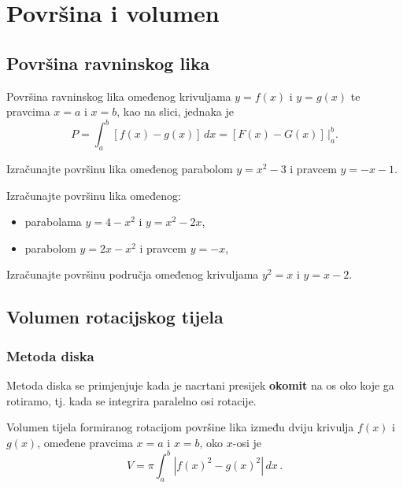 \section{Površina i volumen}

\subsection{Površina ravninskog lika}

Površina ravninskog lika omeđenog krivuljama $y=f(x)$ i $y=g(x)$ te pravcima
$x=a$ i $x=b$, kao na slici, jednaka je
$$
    P=\int_a^b [f(x) - g(x)]\,dx = [F(x) - G(x)]\,\Big|_a^b.
$$

\begin{example}
    Izračunajte površinu lika omeđenog parabolom $y=x^2-3$ i pravcem $y=-x-1$.
\end{example}

\begin{example}
    Izračunajte površinu lika omeđenog:
    \begin{itemize}
        \item parabolama $y=4-x^2$ i $y=x^2-2x$,
        \item parabolom $y=2x-x^2$ i pravcem $y=-x$,
    \end{itemize}
\end{example}


\begin{example}
    Izračunajte površinu područja omeđenog krivuljama $y^2=x$ i $y=x-2$.
\end{example}

\subsection{Volumen rotacijskog tijela}

\subsubsection{Metoda diska}

Metoda diska se primjenjuje kada je nacrtani presijek \textbf{okomit} na os oko
koje ga rotiramo, tj. kada se integrira paralelno osi rotacije.

Volumen tijela formiranog rotacijom površine lika između dviju krivulja $f(x)$ i
$g(x)$, omeđene pravcima $x=a$ i $x=b$, oko $x$-osi je
$$
    V=\pi \int_a^b |f(x)^2-g(x)^2|\,dx\,.
$$

